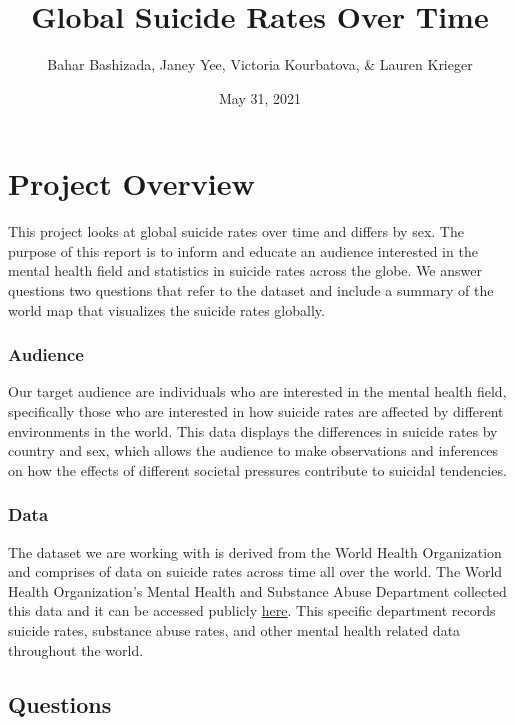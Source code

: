 \documentclass[
]{article}
\title{Global Suicide Rates Over Time}
\author{Bahar Bashizada, Janey Yee, Victoria Kourbatova, \& Lauren
Krieger}
\date{May 31, 2021}
\begin{document}
\maketitle

\hypertarget{project-overview}{%
\section{Project Overview}\label{project-overview}}

This project looks at global suicide rates over time and differs by sex.
The purpose of this report is to inform and educate an audience
interested in the mental health field and statistics in suicide rates
across the globe. We answer questions two questions that refer to the
dataset and include a summary of the world map that visualizes the
suicide rates globally.

\hypertarget{audience}{%
\subsubsection{Audience}\label{audience}}

Our target audience are individuals who are interested in the mental
health field, specifically those who are interested in how suicide rates
are affected by different environments in the world. This data displays
the differences in suicide rates by country and sex, which allows the
audience to make observations and inferences on how the effects of
different societal pressures contribute to suicidal tendencies.

\hypertarget{data}{%
\subsubsection{Data}\label{data}}

The dataset we are working with is derived from the World Health
Organization and comprises of data on suicide rates across time all over
the world. The World Health Organization's Mental Health and Substance
Abuse Department collected this data and it can be accessed publicly
\href{https://apps.who.int/gho/data/node.main.MHSUICIDEASDR?lang=en}{here}.
This specific department records suicide rates, substance abuse rates,
and other mental health related data throughout the world.

\hypertarget{questions}{%
\subsection{Questions}\label{questions}}
\end{document}
